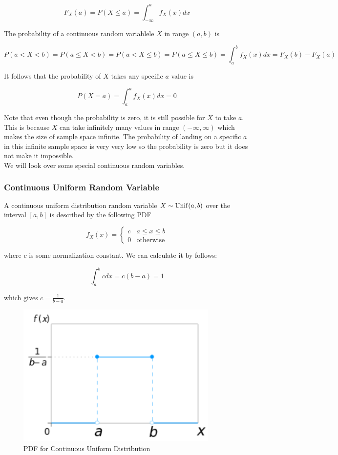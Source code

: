$$F_X(a)=P(X\le a)=\int_{-\infty}^a f_X(x) dx$$

The probability of a continuous random variablele $X$ in range $(a,b)$ is

$$P(a < X < b)=P(a \le X < b)=P(a < X \le b)=P(a \le X \le b)=\int_a^b f_X(x) dx = F_X(b)-F_X(a)$$

It follows that the probability of $X$ takes any specific $a$ value is

$$P(X=a)=\int_{a}^a f_X(x) dx=0$$

Note that even though the probability is zero, it is still possible for $X$ to take $a$. This is because $X$ can take infinitely many values in range $(-\infty,\infty)$ which makes the size of sample space infinite. The probability of landing on a specific $a$ in this infinite sample space is very very low so the probability is zero but it does not make it impossible. \\

We will look over some special continuous random variables.

\subsubsection{Continuous Uniform Random Variable}

A continuous uniform distribution random variable $X\sim \operatorname{Unif}(a, b)$ over the interval $[a,b]$ is described by the following PDF

$$
f_X(x)=\begin{cases}
	c & a \le x \le b \\
	0 & \text{otherwise}
\end{cases}
$$

where $c$ is some normalization constant. We can calculate it by follows:

\[\int_a^b cdx=c(b-a)=1\]

which gives $c=\frac{1}{b-a}$.

\begin{figure}[H]
	\centering
	\includegraphics[width=100mm]{13.png}
	\caption{PDF for Continuous Uniform Distribution}
\end{figure}

